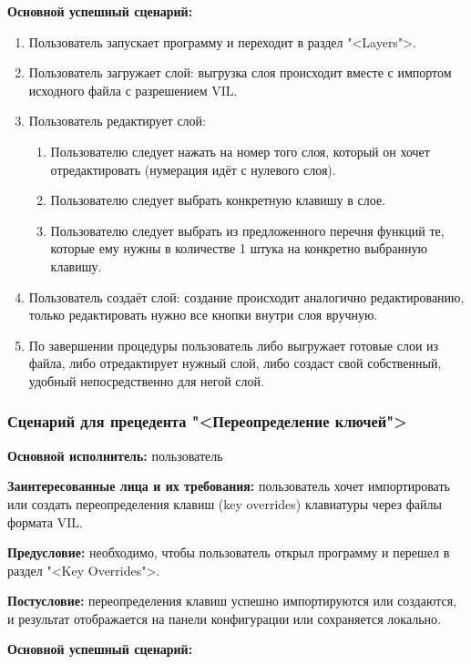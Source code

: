 \textbf{Основной успешный сценарий:}

\begin{enumerate}
\item Пользователь запускает программу и переходит в раздел "<Layers">.
\item[2.1. ] Пользователь загружает слой: выгрузка слоя происходит вместе с импортом исходного файла с разрешением VIL.
\item[2.2. ] Пользователь редактирует слой:

\begin{enumerate}
	\item Пользователю следует нажать на номер того слоя, который он хочет отредактировать (нумерация идёт с нулевого слоя).
	\item Пользователю следует выбрать конкретную клавишу в слое.
	\item Пользователю следует выбрать из предложенного перечня функций те, которые ему нужны в количестве 1 штука на конкретно выбранную клавишу.
\end{enumerate}

\item[2.3. ] Пользователь создаёт слой: создание происходит аналогично редактированию, только редактировать нужно все кнопки внутри слоя вручную.
\item[3. ] По завершении процедуры пользователь либо выгружает готовые слои из файла, либо отредактирует нужный слой, либо создаст свой собственный, удобный непосредственно для негой слой.
\end{enumerate}

\subsubsection{Сценарий для прецедента "<Переопределение ключей">}

\textbf{Основной исполнитель:} пользователь

\textbf{Заинтересованные лица и их требования:} пользователь хочет импортировать или создать переопределения клавиш (key overrides) клавиатуры через файлы формата VIL.

\textbf{Предусловие:} необходимо, чтобы пользователь открыл программу и перешел в раздел "<Key Overrides">.

\textbf{Постусловие:} переопределения клавиш успешно импортируются или создаются, и результат отображается на панели конфигурации или сохраняется локально.

\textbf{Основной успешный сценарий:}

